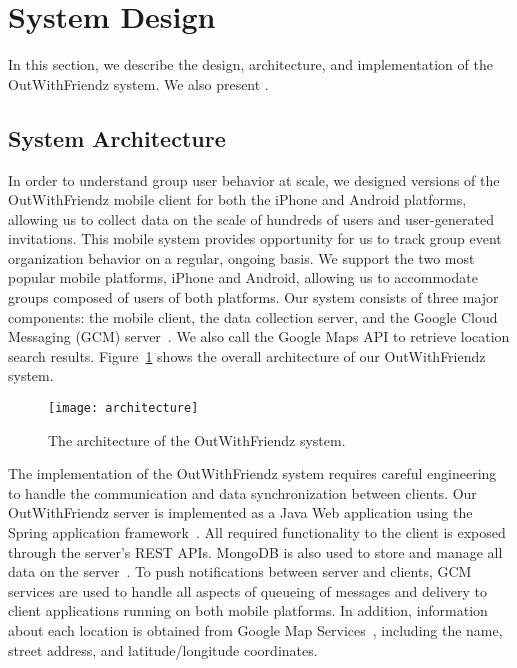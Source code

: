 \section{System Design}
\label{sec:methodology} 

In this section, we describe the design, architecture, and implementation of the
OutWithFriendz system.  We also present .

\subsection{System Architecture}
In order to understand group user behavior at scale, we designed versions of the
OutWithFriendz mobile client for both the iPhone and Android platforms, allowing
us to collect data on the scale of hundreds of users and user-generated
invitations. This mobile system provides opportunity for us to track group
event organization behavior on a regular, ongoing basis. We support the two most
popular mobile platforms, iPhone and Android, allowing us to accommodate groups composed of
users of both platforms.
Our system consists of three major components: the mobile client, the data
collection server, and the Google Cloud Messaging (GCM)
server~\cite{developers2014google}. We also call the Google Maps API to retrieve
location search results.  Figure~\ref{fig:architecture} shows the overall
architecture of our OutWithFriendz system.

\begin{figure}
\centering
\texttt{[image: architecture]}
\caption{The architecture of the OutWithFriendz system.}
\label{fig:architecture}
\end{figure}

The implementation of the OutWithFriendz system requires careful engineering to
handle the communication and data synchronization between clients. Our
OutWithFriendz server is implemented as a Java Web application using the Spring
application framework~\cite{Spring}. All required functionality to the client is
exposed through the server's REST APIs. MongoDB is also used to store and manage
all data on the server~\cite{mongodb}. To push notifications between server and
clients, GCM services are used to handle all aspects of queueing of messages and
delivery to client applications running on both mobile platforms. In addition,
information about each location is obtained from Google Map
Services~\cite{googlemaps}, including the name, street address, and
latitude/longitude coordinates.

